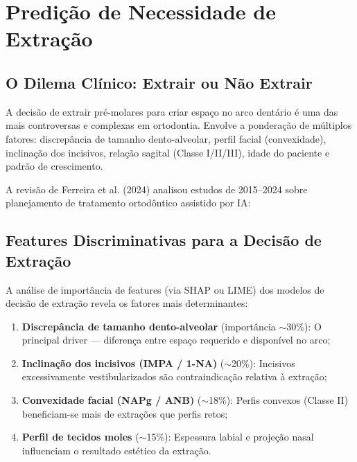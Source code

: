 \section{Predição de Necessidade de Extração}

\subsection{O Dilema Clínico: Extrair ou Não Extrair}

A decisão de extrair pré-molares para criar espaço no arco dentário é uma das mais controversas e complexas em ortodontia. Envolve a ponderação de múltiplos fatores: discrepância de tamanho dento-alveolar, perfil facial (convexidade), inclinação dos incisivos, relação sagital (Classe I/II/III), idade do paciente e padrão de crescimento.

A revisão de Ferreira et al. (2024) analisou estudos de 2015--2024 sobre planejamento de tratamento ortodôntico assistido por IA:


\subsection{Features Discriminativas para a Decisão de Extração}

A análise de importância de features (via SHAP ou LIME) dos modelos de decisão de extração revela os fatores mais determinantes:
\begin{enumerate}
    \item \textbf{Discrepância de tamanho dento-alveolar} (importância $\sim$30\%): O principal driver --- diferença entre espaço requerido e disponível no arco;
    \item \textbf{Inclinação dos incisivos (IMPA / 1-NA)} ($\sim$20\%): Incisivos excessivamente vestibularizados são contraindicação relativa à extração;
    \item \textbf{Convexidade facial (NAPg / ANB)} ($\sim$18\%): Perfis convexos (Classe II) beneficiam-se mais de extrações que perfis retos;
    \item \textbf{Perfil de tecidos moles} ($\sim$15\%): Espessura labial e projeção nasal influenciam o resultado estético da extração.
\end{enumerate}

